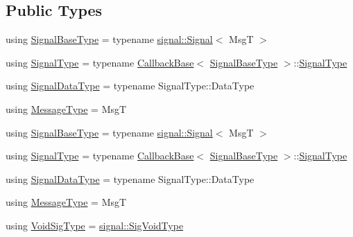 \subsection*{Public Types}
\begin{DoxyCompactItemize}
\item 
using \hyperlink{structvt_1_1pipe_1_1callback_1_1_callback_bcast_a25891ab2b71bd3b3883df52172412607}{Signal\+Base\+Type} = typename \hyperlink{structvt_1_1pipe_1_1signal_1_1_signal}{signal\+::\+Signal}$<$ MsgT $>$
\item 
using \hyperlink{structvt_1_1pipe_1_1callback_1_1_callback_bcast_a114e04d430944cfbc25e3f117a50d03e}{Signal\+Type} = typename \hyperlink{structvt_1_1pipe_1_1callback_1_1_callback_base}{Callback\+Base}$<$ \hyperlink{structvt_1_1pipe_1_1callback_1_1_callback_bcast_a25891ab2b71bd3b3883df52172412607}{Signal\+Base\+Type} $>$\+::\hyperlink{structvt_1_1pipe_1_1callback_1_1_callback_bcast_a114e04d430944cfbc25e3f117a50d03e}{Signal\+Type}
\item 
using \hyperlink{structvt_1_1pipe_1_1callback_1_1_callback_bcast_aaf994b71056001334d30d74fa9c958f9}{Signal\+Data\+Type} = typename Signal\+Type\+::\+Data\+Type
\item 
using \hyperlink{structvt_1_1pipe_1_1callback_1_1_callback_bcast_a71dc6da3c022c5fe989265da28bedec6}{Message\+Type} = MsgT
\item 
using \hyperlink{structvt_1_1pipe_1_1callback_1_1_callback_bcast_a25891ab2b71bd3b3883df52172412607}{Signal\+Base\+Type} = typename \hyperlink{structvt_1_1pipe_1_1signal_1_1_signal}{signal\+::\+Signal}$<$ MsgT $>$
\item 
using \hyperlink{structvt_1_1pipe_1_1callback_1_1_callback_bcast_a114e04d430944cfbc25e3f117a50d03e}{Signal\+Type} = typename \hyperlink{structvt_1_1pipe_1_1callback_1_1_callback_base}{Callback\+Base}$<$ \hyperlink{structvt_1_1pipe_1_1callback_1_1_callback_bcast_a25891ab2b71bd3b3883df52172412607}{Signal\+Base\+Type} $>$\+::\hyperlink{structvt_1_1pipe_1_1callback_1_1_callback_bcast_a114e04d430944cfbc25e3f117a50d03e}{Signal\+Type}
\item 
using \hyperlink{structvt_1_1pipe_1_1callback_1_1_callback_bcast_aaf994b71056001334d30d74fa9c958f9}{Signal\+Data\+Type} = typename Signal\+Type\+::\+Data\+Type
\item 
using \hyperlink{structvt_1_1pipe_1_1callback_1_1_callback_bcast_a71dc6da3c022c5fe989265da28bedec6}{Message\+Type} = MsgT
\item 
using \hyperlink{structvt_1_1pipe_1_1callback_1_1_callback_bcast_a64032b57b71c27653b93b3e13bf38145}{Void\+Sig\+Type} = \hyperlink{namespacevt_1_1pipe_1_1signal_acbe257d1ae44f20fa9fd9b6ed3057caf}{signal\+::\+Sig\+Void\+Type}

\end{DoxyCompactItemize}
